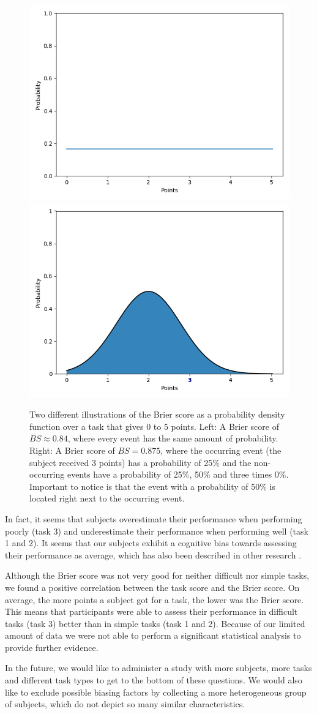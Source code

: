 \documentclass[../main/main.tex]{subfiles}
\begin{document}
	\begin{figure}[H]
		\centering
		\includegraphics[width=.49\textwidth]{../assets/brier_plot.png}
		\includegraphics[width=.49\textwidth]{../assets/brier_plot2.png}
		\caption{Two different illustrations of the Brier score as a probability density function over a task that gives 0 to 5 points. Left: A Brier score of $BS \approx 0.84$, where every event has the same amount of probability. Right: A Brier score of $BS = 0.875$, where the occurring event (the subject received 3 points) has a probability of 25\% and the non-occurring events have a probability of 25\%, 50\% and three times 0\%. Important to notice is that the event with a probability of 50\% is located right next to the occurring event.}
		\label{fig:briers}
	\end{figure}
	\newpage
	\noindent In fact, it seems that subjects overestimate their performance when performing poorly (task 3) and underestimate their performance when performing well (task 1 and 2). It seems that our subjects exhibit a cognitive bias towards assessing their performance as average, which has also been described in other research \citep{kruger1999unskilled}.

	Although the Brier score was not very good for neither difficult nor simple tasks, we found a positive correlation between the task score and the Brier score. On average, the more points a subject got for a task, the lower was the Brier score. This means that participants were able to assess their performance in difficult tasks (task 3) better than in simple tasks (task 1 and 2). Because of our limited amount of data we were not able to perform a significant statistical analysis to provide further evidence.
	
	In the future, we would like to administer a study with more subjects, more tasks and different task types to get to the bottom of these questions. We would also like to exclude possible biasing factors by collecting a more heterogeneous group of subjects, which do not depict so many similar characteristics.
	
	
	
	
\end{document}
